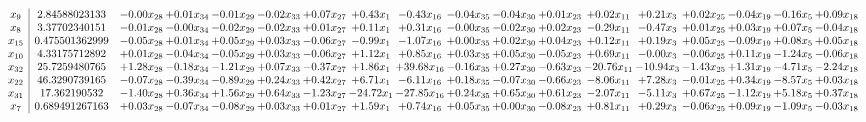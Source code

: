\documentclass[9pt]{article}
\begin{document}
 \[\begin{array}{c| c c@{\hskip 2pt} c@{\hskip 2pt} c@{\hskip 2pt} c@{\hskip 2pt} c@{\hskip 2pt} c@{\hskip 2pt} c@{\hskip 2pt} c@{\hskip 2pt} c@{\hskip 2pt} c@{\hskip 2pt} c@{\hskip 2pt} c@{\hskip 2pt} c@{\hskip 2pt} c@{\hskip 2pt} c@{\hskip 2pt} c@{\hskip 2pt} }
 x_{9}   &  2.84588023133 & -0.00 x_{28} & +  0.01 x_{34} & -0.01 x_{29} & -0.02 x_{33} & +  0.07 x_{27} & +  0.43 x_{1} & -0.43 x_{16} & -0.04 x_{35} & -0.04 x_{30} & +  0.01 x_{23} & +  0.02 x_{11} & +  0.21 x_{3} & +  0.02 x_{25} & -0.04 x_{19} & -0.16 x_{5} & +  0.09 x_{18}\\
 x_{8}   &  3.37702340151 & -0.01 x_{28} & -0.00 x_{34} & -0.02 x_{29} & -0.02 x_{33} & +  0.01 x_{27} & +  0.11 x_{1} & +  0.31 x_{16} & -0.00 x_{35} & -0.02 x_{30} & +  0.02 x_{23} & -0.29 x_{11} & -0.47 x_{3} & +  0.01 x_{25} & +  0.03 x_{19} & +  0.07 x_{5} & -0.04 x_{18}\\
 x_{15}   &  0.475501362999 & -0.05 x_{28} & +  0.01 x_{34} & +  0.05 x_{29} & +  0.03 x_{33} & -0.06 x_{27} & -0.99 x_{1} & -1.07 x_{16} & +  0.00 x_{35} & +  0.02 x_{30} & +  0.04 x_{23} & +  0.12 x_{11} & +  0.19 x_{3} & +  0.05 x_{25} & -0.09 x_{19} & +  0.08 x_{5} & +  0.05 x_{18}\\
 x_{10}   &  4.33175712892 & +  0.01 x_{28} & -0.04 x_{34} & -0.05 x_{29} & +  0.03 x_{33} & -0.06 x_{27} & +  1.12 x_{1} & +  0.85 x_{16} & +  0.03 x_{35} & +  0.05 x_{30} & -0.05 x_{23} & +  0.69 x_{11} & -0.00 x_{3} & -0.06 x_{25} & +  0.11 x_{19} & -1.24 x_{5} & -0.06 x_{18}\\
 x_{32}   &  25.7259480765 & +  1.28 x_{28} & -0.18 x_{34} & -1.21 x_{29} & +  0.07 x_{33} & -0.37 x_{27} & +  1.86 x_{1} & + 39.68 x_{16} & -0.16 x_{35} & +  0.27 x_{30} & -0.63 x_{23} & -20.76 x_{11} & -10.94 x_{3} & -1.43 x_{25} & +  1.31 x_{19} & -4.71 x_{5} & -2.24 x_{18}\\
 x_{22}   &  46.3290739165 & -0.07 x_{28} & -0.39 x_{34} & -0.89 x_{29} & +  0.24 x_{33} & +  0.42 x_{27} & +  6.71 x_{1} & -6.11 x_{16} & +  0.18 x_{35} & -0.07 x_{30} & -0.66 x_{23} & -8.06 x_{11} & +  7.28 x_{3} & -0.01 x_{25} & +  0.34 x_{19} & -8.57 x_{5} & +  0.03 x_{18}\\
 x_{31}   &  17.362190532 & -1.40 x_{28} & +  0.36 x_{34} & +  1.56 x_{29} & +  0.64 x_{33} & -1.23 x_{27} & -24.72 x_{1} & -27.85 x_{16} & +  0.24 x_{35} & +  0.65 x_{30} & +  0.61 x_{23} & -2.07 x_{11} & -5.11 x_{3} & +  0.67 x_{25} & -1.12 x_{19} & +  5.18 x_{5} & +  0.37 x_{18}\\
 x_{7}   &  0.689491267163 & +  0.03 x_{28} & -0.07 x_{34} & -0.08 x_{29} & +  0.03 x_{33} & +  0.01 x_{27} & +  1.59 x_{1} & +  0.74 x_{16} & +  0.05 x_{35} & +  0.00 x_{30} & -0.08 x_{23} & +  0.81 x_{11} & +  0.29 x_{3} & -0.06 x_{25} & +  0.09 x_{19} & -1.09 x_{5} & -0.03 x_{18}\\

\end{array}\]
\end{document}
